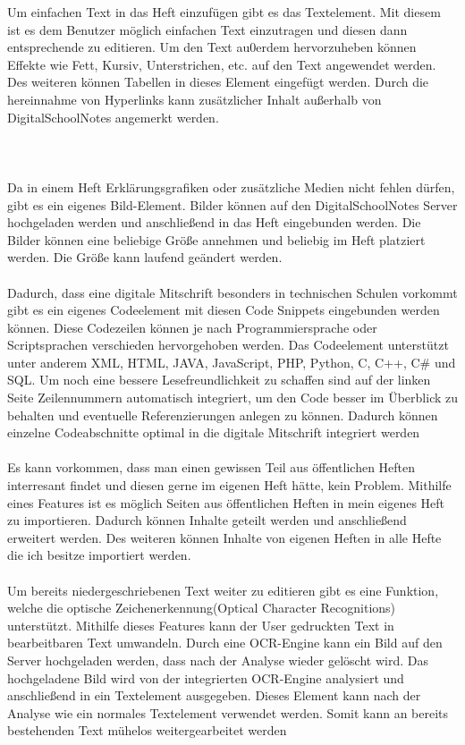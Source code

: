 Um einfachen Text in das Heft einzufügen gibt es das Textelement. Mit diesem ist es dem Benutzer möglich einfachen Text einzutragen und diesen dann entsprechende zu editieren. Um den Text au0erdem hervorzuheben können Effekte wie Fett, Kursiv, Unterstrichen, etc. auf den Text angewendet werden. Des weiteren können Tabellen in dieses Element eingefügt werden. Durch die hereinnahme von Hyperlinks kann zusätzlicher Inhalt außerhalb von DigitalSchoolNotes angemerkt werden.\\
\\\\\\
Da in einem Heft Erklärungsgrafiken oder zusätzliche Medien nicht fehlen dürfen, gibt es ein eigenes Bild-Element. Bilder können auf den DigitalSchoolNotes Server hochgeladen werden und anschließend in das Heft eingebunden werden. Die Bilder können eine beliebige Größe annehmen und beliebig im Heft platziert werden. Die Größe kann laufend geändert werden.\\
\\
Dadurch, dass eine digitale Mitschrift besonders in technischen Schulen vorkommt gibt es ein eigenes Codeelement mit diesen Code Snippets eingebunden werden können. Diese Codezeilen können je nach Programmiersprache oder Scriptsprachen verschieden hervorgehoben werden. Das Codeelement unterstützt unter anderem XML, HTML, JAVA, JavaScript, PHP, Python, C, C++, C\# und SQL. Um noch eine bessere Lesefreundlichkeit zu schaffen sind auf der linken Seite Zeilennummern automatisch integriert, um den Code besser im Überblick zu behalten und eventuelle Referenzierungen anlegen zu können. Dadurch können einzelne Codeabschnitte optimal in die digitale Mitschrift integriert werden\\
\\
Es kann vorkommen, dass man einen gewissen Teil aus öffentlichen Heften interresant findet und diesen gerne im eigenen Heft hätte, kein Problem. Mithilfe eines Features ist es möglich Seiten aus öffentlichen Heften in mein eigenes Heft zu importieren. Dadurch können Inhalte geteilt werden und anschließend erweitert werden. Des weiteren können Inhalte von eigenen Heften in alle Hefte die ich besitze importiert werden.\\
\\
Um bereits niedergeschriebenen Text weiter zu editieren gibt es eine Funktion, welche die optische Zeichenerkennung(Optical Character Recognitions) unterstützt. Mithilfe dieses Features kann der User gedruckten Text in bearbeitbaren Text umwandeln. Durch eine OCR-Engine kann ein Bild auf den Server hochgeladen werden, dass nach der Analyse wieder gelöscht wird. Das hochgeladene Bild wird von der integrierten OCR-Engine analysiert und anschließend in ein Textelement ausgegeben. Dieses Element kann nach der Analyse wie ein normales Textelement verwendet werden. Somit kann an bereits bestehenden Text mühelos weitergearbeitet werden\\
